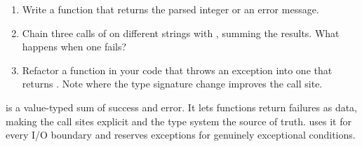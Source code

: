 \begin{enumerate}[leftmargin=*]
  \item Write a function  that returns the parsed
    integer or an error message.
  \item Chain three calls of  on different
    strings with , summing the results. What
    happens when one fails?
  \item Refactor a function in your code that throws an
    exception into one that returns . Note where
    the type signature change improves the call site.
\end{enumerate}

\begin{recap}
 is a value-typed sum of success and error.
It lets functions return failures as data, making the call sites
explicit and the type system the source of truth. \maya{} uses
it for every I/O boundary and reserves exceptions for genuinely
exceptional conditions.
\end{recap}
